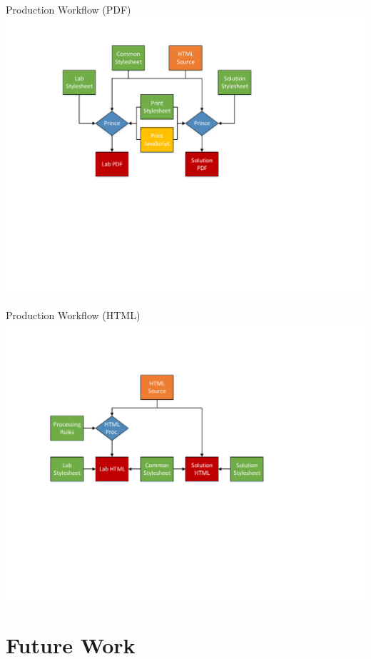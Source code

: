\documentclass{beamer}
\begin{document}
	\begin{frame}{Production Workflow (PDF)}
		\includegraphics[width=\textwidth, clip=true, trim=1.3in 3in 3in 0.75in]{workflow.pdf}
	\end{frame}			

	\begin{frame}{Production Workflow (HTML)}
		\includegraphics[width=\textwidth, clip=true, trim=1.3in 3in 3in 1in]{online-workflow.pdf}
	\end{frame}	
		
	\section{Future Work}
\end{document}
